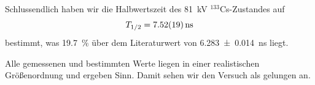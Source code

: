 Schlussendlich haben wir die Halbwertszeit des \SI{81}{\kilo\volt} $^{133}$Cs-Zustandes auf
\begin{displaymath}
    T_{1/2} = \SI{7,52 \pm 0,19}{\nano\second}
\end{displaymath}
bestimmt, was \SI{19,7}{\percent} über dem Literaturwert von \SI{6,283 \pm 0,014}{\nano\second} \cite{Anleitung} liegt.

Alle gemessenen und bestimmten Werte liegen in einer realistischen Größenordnung und ergeben Sinn.
Damit sehen wir den Versuch als gelungen an.